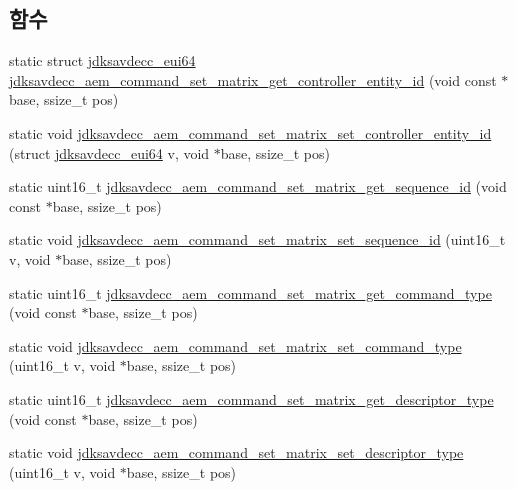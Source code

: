 \subsection*{함수}
\begin{DoxyCompactItemize}
\item 
static struct \hyperlink{structjdksavdecc__eui64}{jdksavdecc\+\_\+eui64} \hyperlink{group__command__set__matrix_gaa378876855ed73a6816f381bc92eba91}{jdksavdecc\+\_\+aem\+\_\+command\+\_\+set\+\_\+matrix\+\_\+get\+\_\+controller\+\_\+entity\+\_\+id} (void const $\ast$base, ssize\+\_\+t pos)
\item 
static void \hyperlink{group__command__set__matrix_gaa12a6515787a1aa1fb6f799eda2d59d8}{jdksavdecc\+\_\+aem\+\_\+command\+\_\+set\+\_\+matrix\+\_\+set\+\_\+controller\+\_\+entity\+\_\+id} (struct \hyperlink{structjdksavdecc__eui64}{jdksavdecc\+\_\+eui64} v, void $\ast$base, ssize\+\_\+t pos)
\item 
static uint16\+\_\+t \hyperlink{group__command__set__matrix_ga2788d526ce507a2d468247f04a0c15bf}{jdksavdecc\+\_\+aem\+\_\+command\+\_\+set\+\_\+matrix\+\_\+get\+\_\+sequence\+\_\+id} (void const $\ast$base, ssize\+\_\+t pos)
\item 
static void \hyperlink{group__command__set__matrix_ga216d123fcbd5aa82097ea402ad0bef4e}{jdksavdecc\+\_\+aem\+\_\+command\+\_\+set\+\_\+matrix\+\_\+set\+\_\+sequence\+\_\+id} (uint16\+\_\+t v, void $\ast$base, ssize\+\_\+t pos)
\item 
static uint16\+\_\+t \hyperlink{group__command__set__matrix_gae7e2dc9920074b51147a24e2ef71143a}{jdksavdecc\+\_\+aem\+\_\+command\+\_\+set\+\_\+matrix\+\_\+get\+\_\+command\+\_\+type} (void const $\ast$base, ssize\+\_\+t pos)
\item 
static void \hyperlink{group__command__set__matrix_ga4c0b05e431470a64ab771e2798635c18}{jdksavdecc\+\_\+aem\+\_\+command\+\_\+set\+\_\+matrix\+\_\+set\+\_\+command\+\_\+type} (uint16\+\_\+t v, void $\ast$base, ssize\+\_\+t pos)
\item 
static uint16\+\_\+t \hyperlink{group__command__set__matrix_ga7d17c2e51205c6a76b6a32c4720b82e8}{jdksavdecc\+\_\+aem\+\_\+command\+\_\+set\+\_\+matrix\+\_\+get\+\_\+descriptor\+\_\+type} (void const $\ast$base, ssize\+\_\+t pos)
\item 
static void \hyperlink{group__command__set__matrix_gad41fa222412ebec9411b38e8c60fede5}{jdksavdecc\+\_\+aem\+\_\+command\+\_\+set\+\_\+matrix\+\_\+set\+\_\+descriptor\+\_\+type} (uint16\+\_\+t v, void $\ast$base, ssize\+\_\+t pos)
\item 

\end{DoxyCompactItemize}
